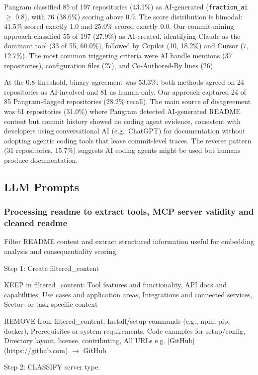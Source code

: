 \documentclass[manuscript,screen,nonacm,oneside]{acmart}
\begin{document}
Pangram classified 85 of 197 repositories (43.1\%) as AI-generated (\texttt{fraction\_ai} $\geq$ 0.8), with 76 (38.6\%) scoring above 0.9. The score distribution is bimodal: 41.5\% scored exactly 1.0 and 25.0\% scored exactly 0.0. Our commit-mining approach classified 55 of 197 (27.9\%) as AI-created, identifying Claude as the dominant tool (33 of 55, 60.0\%), followed by Copilot (10, 18.2\%) and Cursor (7, 12.7\%). The most common triggering criteria were AI handle mentions
(37 repositories), configuration files (27), and Co-Authored-By lines (26).

At the 0.8 threshold, binary agreement was 53.3\%: both methods agreed on 24 repositories as AI-involved and 81 as human-only. Our approach captured 24 of 85  Pangram-flagged repositories (28.2\% recall). The main source of disagreement was 61 repositories (31.0\%) where Pangram detected AI-generated README content but commit history showed no coding agent evidence, consistent with developers using conversational
AI (e.g.\ ChatGPT) for documentation without adopting agentic coding tools that leave commit-level traces. The reverse pattern (31 repositories, 15.7\%) suggests AI coding agents might be used but humans produce documentation.

\subsection{LLM Prompts}
\label{app:prompts}

\subsubsection{Processing readme to extract tools, MCP server validity and cleaned readme}

Filter README content and extract structured information useful for embedding analysis and consequentiality scoring.

Step 1: Create filtered\_content

KEEP in filtered\_content: Tool features and functionality, API docs and capabilities, Use cases and application areas, Integrations and connected services, Sector- or task-specific context

REMOVE from filtered\_content: Install/setup commands (e.g., npm, pip, docker), Prerequisites or system requirements, Code examples for setup/config, Directory layout, license, contributing, All URLs e.g. [GitHub](https://github.com) $\rightarrow$ GitHub

Step 2: CLASSIFY server type:
\end{document}
